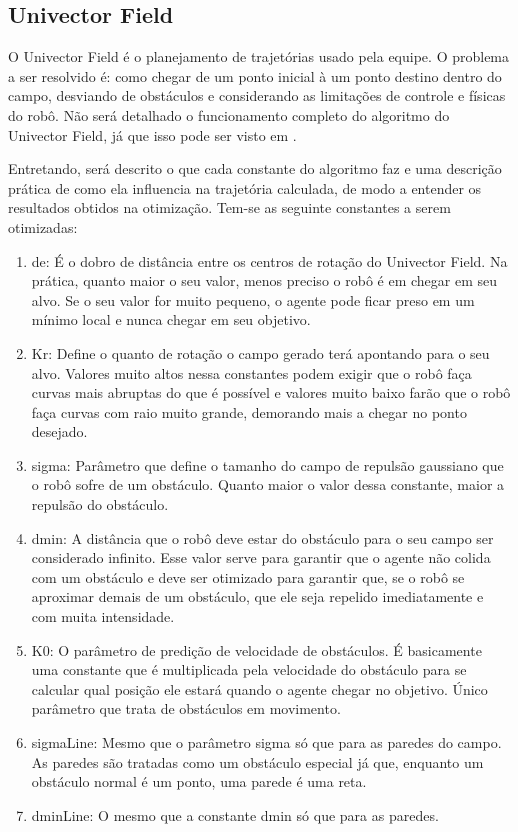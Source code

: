 \documentclass[a4paper,12pt]{article}
\begin{document}
\subsection{Univector Field}

O Univector Field é o planejamento de trajetórias usado pela equipe. O problema a ser resolvido é: como chegar de um ponto inicial à um ponto destino dentro do campo, desviando de obstáculos e considerando as limitações de controle e físicas do robô. Não será detalhado o funcionamento completo do algoritmo do Univector Field, já que isso pode ser visto em \cite{univector}.

Entretando, será descrito o que cada constante do algoritmo faz e uma descrição prática de como ela influencia na trajetória calculada, de modo a entender os resultados obtidos na otimização. Tem-se as seguinte constantes a serem otimizadas:
\begin{enumerate}
\item de: É o dobro de distância entre os centros de rotação do Univector Field. Na prática, quanto maior o seu valor, menos preciso o robô é em chegar em seu alvo. Se o seu valor for muito pequeno, o agente pode ficar preso em um mínimo local e nunca chegar em seu objetivo.
\item Kr: Define o quanto de rotação o campo gerado terá apontando para o seu alvo. Valores muito altos nessa constantes podem exigir que o robô faça curvas mais abruptas do que é possível e valores muito baixo farão que o robô faça curvas com raio muito grande, demorando mais a chegar no ponto desejado.
\item sigma: Parâmetro que define o tamanho do campo de repulsão gaussiano que o robô sofre de um obstáculo. Quanto maior o valor dessa constante, maior a repulsão do obstáculo.
\item dmin: A distância que o robô deve estar do obstáculo para o seu campo ser considerado infinito. Esse valor serve para garantir que o agente não colida com um obstáculo e deve ser otimizado para garantir que, se o robô se aproximar demais de um obstáculo, que ele seja repelido imediatamente e com muita intensidade.
\item K0: O parâmetro de predição de velocidade de obstáculos. É basicamente uma constante que é multiplicada pela velocidade do obstáculo para se calcular qual posição ele estará quando o agente chegar no objetivo. Único parâmetro que trata de obstáculos em movimento.
\item sigmaLine: Mesmo que o parâmetro sigma só que para as paredes do campo. As paredes são tratadas como um obstáculo especial já que, enquanto um obstáculo normal é um ponto, uma parede é uma reta.
\item dminLine:  O mesmo que a constante dmin só que para as paredes.
\end{enumerate}
\end{document}
